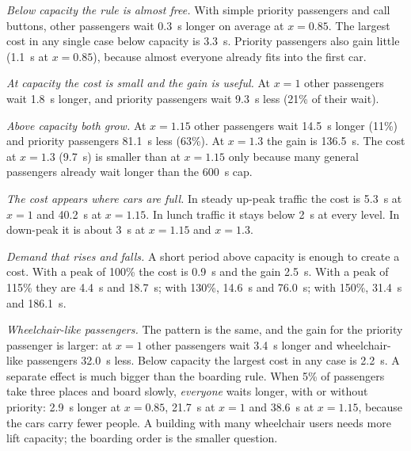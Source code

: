 \emph{Below capacity the rule is almost free.} With simple priority passengers and call buttons, other passengers wait 0.3~s longer on average at $x=0.85$. The largest cost in any single case below capacity is 3.3~s. Priority passengers also gain little (1.1~s at $x=0.85$), because almost everyone already fits into the first car.

\emph{At capacity the cost is small and the gain is useful.} At $x=1$ other passengers wait 1.8~s longer, and priority passengers wait 9.3~s less (21\% of their wait).

\emph{Above capacity both grow.} At $x=1.15$ other passengers wait 14.5~s longer (11\%) and priority passengers 81.1~s less (63\%). At $x=1.3$ the gain is 136.5~s. The cost at $x=1.3$ (9.7~s) is smaller than at $x=1.15$ only because many general passengers already wait longer than the 600~s cap.

\emph{The cost appears where cars are full.} In steady up-peak traffic the cost is 5.3~s at $x=1$ and 40.2~s at $x=1.15$. In lunch traffic it stays below 2~s at every level. In down-peak it is about 3~s at $x=1.15$ and $x=1.3$.

\emph{Demand that rises and falls.} A short period above capacity is enough to create a cost. With a peak of 100\% the cost is 0.9~s and the gain 2.5~s. With a peak of 115\% they are 4.4~s and 18.7~s; with 130\%, 14.6~s and 76.0~s; with 150\%, 31.4~s and 186.1~s.

\emph{Wheelchair-like passengers.} The pattern is the same, and the gain for the priority passenger is larger: at $x=1$ other passengers wait 3.4~s longer and wheelchair-like passengers 32.0~s less. Below capacity the largest cost in any case is 2.2~s. A separate effect is much bigger than the boarding rule. When 5\% of passengers take three places and board slowly, \emph{everyone} waits longer, with or without priority: 2.9~s longer at $x=0.85$, 21.7~s at $x=1$ and 38.6~s at $x=1.15$, because the cars carry fewer people. A building with many wheelchair users needs more lift capacity; the boarding order is the smaller question.

